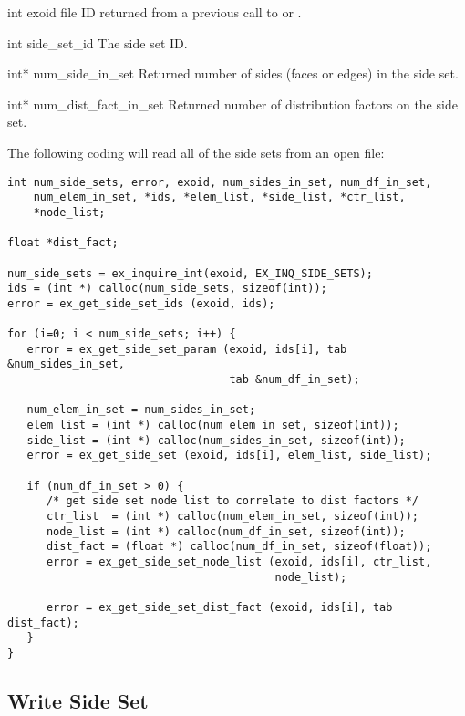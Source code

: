 \begin{parameters}
\item[{int exoid} {\R{}}]
\exo{} file ID returned from a previous call to 
or .

\item[{int side_set_id \R{}}]
The side set ID.

\item[{int* num_side_in_set \W{}}]
Returned number of sides (faces or edges) in the side set.

\item[{int* num_dist_fact_in_set \W{}}]
Returned number of distribution factors on the side set.
\end{parameters}

The following coding will read all of the side sets from
an open \exo{} file:

\begin{lstlisting}
int num_side_sets, error, exoid, num_sides_in_set, num_df_in_set,
    num_elem_in_set, *ids, *elem_list, *side_list, *ctr_list,
    *node_list;

float *dist_fact;

num_side_sets = ex_inquire_int(exoid, EX_INQ_SIDE_SETS);
ids = (int *) calloc(num_side_sets, sizeof(int));
error = ex_get_side_set_ids (exoid, ids);

for (i=0; i < num_side_sets; i++) {
   error = ex_get_side_set_param (exoid, ids[i], tab &num_sides_in_set,
                                  tab &num_df_in_set);

   num_elem_in_set = num_sides_in_set;
   elem_list = (int *) calloc(num_elem_in_set, sizeof(int));
   side_list = (int *) calloc(num_sides_in_set, sizeof(int));
   error = ex_get_side_set (exoid, ids[i], elem_list, side_list);

   if (num_df_in_set > 0) {
      /* get side set node list to correlate to dist factors */
      ctr_list  = (int *) calloc(num_elem_in_set, sizeof(int));
      node_list = (int *) calloc(num_df_in_set, sizeof(int));
      dist_fact = (float *) calloc(num_df_in_set, sizeof(float));
      error = ex_get_side_set_node_list (exoid, ids[i], ctr_list,
                                         node_list);

      error = ex_get_side_set_dist_fact (exoid, ids[i], tab dist_fact);
   }
}
\end{lstlisting}


\subsection{Write Side Set}

